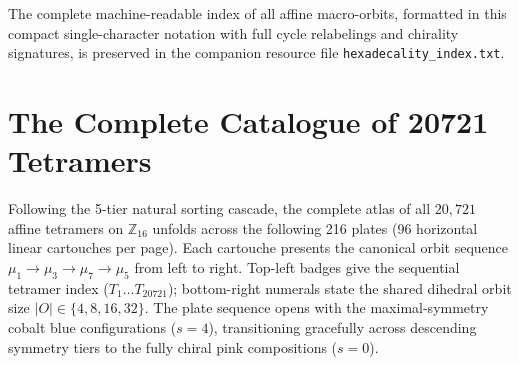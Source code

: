 The complete machine-readable index of all affine macro-orbits, formatted in this compact single-character notation with full cycle relabelings and chirality signatures, is preserved in the companion resource file \texttt{hexadecality\_index.txt}.

\section{The Complete Catalogue of 20721 Tetramers}
\label{sec:tetramers-catalogue}

Following the 5-tier natural sorting cascade, the complete atlas of all $20{,}721$ affine tetramers on $\mathbb{Z}_{16}$ unfolds across the following 216 plates (96 horizontal linear cartouches per page). Each cartouche presents the canonical orbit sequence $\mu_1 \to \mu_3 \to \mu_7 \to \mu_5$ from left to right. Top-left badges give the sequential tetramer index ($T_1 \dots T_{20721}$); bottom-right numerals state the shared dihedral orbit size $|O| \in \{4, 8, 16, 32\}$. The plate sequence opens with the maximal-symmetry cobalt blue configurations ($s = 4$), transitioning gracefully across descending symmetry tiers to the fully chiral pink compositions ($s = 0$).

\clearpage

